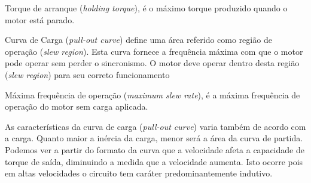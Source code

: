 Torque de arranque (\textit{holding torque}), é o máximo torque produzido quando o motor está parado.

Curva de Carga (\textit{pull-out curve}) define uma área referido como região de operação (\textit{slew region}). Esta curva fornece a frequência máxima com que o motor pode operar sem perder o sincronismo. O motor deve operar dentro desta região (\textit{slew region}) para seu correto funcionamento 

Máxima frequência de operação (\textit{maximum slew rate}), é a máxima frequência de operação do motor sem carga aplicada.

As características da curva de carga (\textit{pull-out curve}) varia também de acordo com a carga. Quanto maior a inércia da carga, menor será a área da curva de partida. Podemos ver a partir do formato da curva que a velocidade afeta a capacidade de torque de saída, diminuindo a medida que a velocidade aumenta. Isto ocorre pois em altas velocidades o circuito tem caráter predominantemente indutivo.


